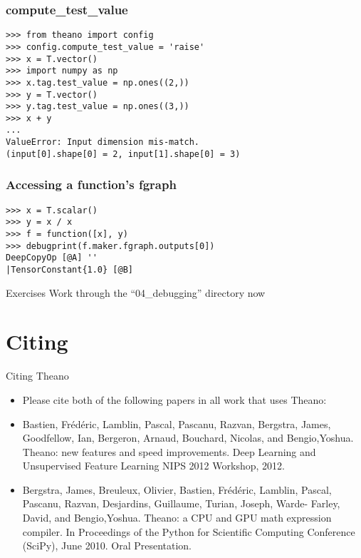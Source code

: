 \documentclass[utf8x,xcolor=pdftex,dvipsnames,table]{beamer}
\begin{document}
\begin{frame}[fragile]
  \frametitle{compute\_test\_value}

\begin{lstlisting}
>>> from theano import config
>>> config.compute_test_value = 'raise'
>>> x = T.vector()
>>> import numpy as np
>>> x.tag.test_value = np.ones((2,))
>>> y = T.vector()
>>> y.tag.test_value = np.ones((3,))
>>> x + y
...
ValueError: Input dimension mis-match.
(input[0].shape[0] = 2, input[1].shape[0] = 3)
\end{lstlisting}
\end{frame}

\begin{frame}[fragile]
  \frametitle{Accessing a function’s fgraph}

\begin{lstlisting}
>>> x = T.scalar()
>>> y = x / x
>>> f = function([x], y)
>>> debugprint(f.maker.fgraph.outputs[0])
DeepCopyOp [@A] ''
|TensorConstant{1.0} [@B]
\end{lstlisting}
\end{frame}

\begin{frame}{Exercises}
Work through the ``04\_debugging'' directory now
\end{frame}

\section{Citing}
\begin{frame}{Citing Theano}
  \begin{itemize}
  \item Please cite both of the following papers in
all work that uses Theano:
  \item Bastien, Frédéric, Lamblin, Pascal, Pascanu, Razvan, Bergstra, James, Goodfellow, Ian, Bergeron, Arnaud, Bouchard, Nicolas, and
     Bengio,Yoshua. Theano: new features and speed improvements. Deep Learning and Unsupervised Feature Learning NIPS 2012
    Workshop, 2012.
  \item Bergstra, James, Breuleux, Olivier, Bastien, Frédéric, Lamblin, Pascal, Pascanu, Razvan, Desjardins, Guillaume, Turian, Joseph, Warde-
     Farley, David, and Bengio,Yoshua. Theano: a CPU and GPU math expression compiler. In Proceedings of the Python for Scientific
      Computing Conference (SciPy), June 2010. Oral Presentation.
  \end{itemize}
\end{frame}
\end{document}
